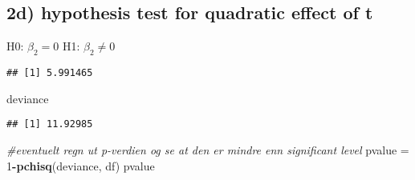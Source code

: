 \documentclass[
]{article}
\newenvironment{Shaded}{\begin{snugshade}}{\end{snugshade}}
\newcommand{\CommentTok}[1]{\textcolor[rgb]{0.56,0.35,0.01}{\textit{#1}}}
\newcommand{\DecValTok}[1]{\textcolor[rgb]{0.00,0.00,0.81}{#1}}
\newcommand{\FloatTok}[1]{\textcolor[rgb]{0.00,0.00,0.81}{#1}}
\newcommand{\KeywordTok}[1]{\textcolor[rgb]{0.13,0.29,0.53}{\textbf{#1}}}
\newcommand{\NormalTok}[1]{#1}
\newcommand{\OperatorTok}[1]{\textcolor[rgb]{0.81,0.36,0.00}{\textbf{#1}}}
\newcommand{\StringTok}[1]{\textcolor[rgb]{0.31,0.60,0.02}{#1}}
\begin{document}
\hypertarget{d-hypothesis-test-for-quadratic-effect-of-t}{%
\subsection{2d) hypothesis test for quadratic effect of
t}\label{d-hypothesis-test-for-quadratic-effect-of-t}}

H0: \(\beta_2 = 0\) H1: \(\beta_2 \neq 0\)

\begin{Shaded}
\end{Shaded}

\begin{verbatim}
## [1] 5.991465
\end{verbatim}

\begin{Shaded}
\begin{Highlighting}[]
\NormalTok{deviance}
\end{Highlighting}
\end{Shaded}

\begin{verbatim}
## [1] 11.92985
\end{verbatim}

\begin{Shaded}
\begin{Highlighting}[]
\CommentTok{#eventuelt regn ut p-verdien og se at den er mindre enn significant level}
\NormalTok{pvalue =}\StringTok{ }\DecValTok{1}\OperatorTok{-}\KeywordTok{pchisq}\NormalTok{(deviance, df)}
\NormalTok{pvalue}
\end{Highlighting}
\end{Shaded}
\end{document}
